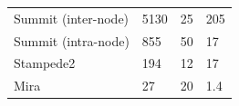 \documentclass[aspectratio=169]{beamer}
\begin{document}
\begin{frame}
\begin{columns}
\begin{column}{0.7\textwidth}
{\begin{table}[]
\begin{tabular}{llll}
          Summit (inter-node) & 5130         & 25          & 205     \\
          Summit (intra-node) & 855          & 50          & 17      \\
          Stampede2           & 194          & 12          & 17      \\
          Mira                & 27           & 20          & 1.4
        \end{tabular}
      \end{table}
      }
    \end{column}
  \end{columns}
\end{frame}
\end{document}
